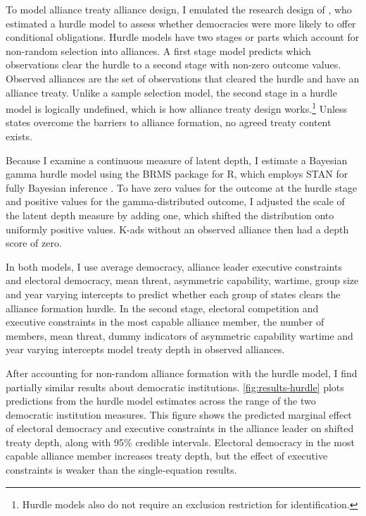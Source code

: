 \documentclass[12pt]{article}
\begin{document}
To model alliance treaty alliance design, I emulated the research design of \citet{Chibaetal2015}, who estimated a hurdle model to assess whether democracies were more likely to offer conditional obligations.
Hurdle models have two stages or parts which account for non-random selection into alliances.
A first stage model predicts which observations clear the hurdle to a second stage with non-zero outcome values. 
Observed alliances are the set of observations that cleared the hurdle and have an alliance treaty. 
Unlike a sample selection model, the second stage in a hurdle model is logically undefined, which is how alliance treaty design works.\footnote{Hurdle models also do not require an exclusion restriction for identification.} 
Unless states overcome the barriers to alliance formation, no agreed treaty content exists. 


Because I examine a continuous measure of latent depth, I estimate a Bayesian gamma hurdle model using the BRMS package for \textsf{R}, which employs STAN for fully Bayesian inference \citep{Buerkner2017}.
To have zero values for the outcome at the hurdle stage and positive values for the gamma-distributed outcome, I adjusted the scale of the latent depth measure by adding one, which shifted the distribution onto uniformly positive values. 
K-ads without an observed alliance then had a depth score of zero. 


In both models, I use average democracy, alliance leader executive constraints and electoral democracy, mean threat, asymmetric capability, wartime, group size and year varying intercepts to predict whether each group of states clears the alliance formation hurdle.
In the second stage, electoral competition and executive constraints in the most capable alliance member, the number of members, mean threat, dummy indicators of asymmetric capability wartime and year varying intercepts model treaty depth in observed alliances. 


After accounting for non-random alliance formation with the hurdle model, I find partially similar results about democratic institutions. 
\autoref{fig:results-hurdle} plots predictions from the hurdle model estimates across the range of the two democratic institution measures. 
This figure shows the predicted marginal effect of electoral democracy and executive constraints in the alliance leader on shifted treaty depth, along with 95\% credible intervals.
Electoral democracy in the most capable alliance member increases treaty depth, but the effect of executive constraints is weaker than the single-equation results.  
\end{document}
